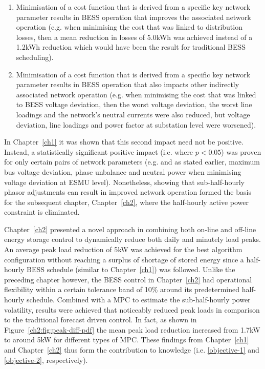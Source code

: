 \begin{enumerate}
	\item Minimisation of a cost function that is derived from a specific key network parameter results in BESS operation that improves the associated network operation (e.g. when minimising the cost that was linked to distribution losses, then a mean reduction in losses of 5.0kWh was achieved instead of a 1.2kWh reduction which would have been the result for traditional BESS scheduling).
	\item Minimisation of a cost function that is derived from a specific key network parameter results in BESS operation that also impacts other indirectly associated network operation (e.g. when minimising the cost that was linked to BESS voltage deviation, then the worst voltage deviation, the worst line loadings and the network's neutral currents were also reduced, but voltage deviation, line loadings and power factor at substation level were worsened).
\end{enumerate}

In Chapter~\ref{ch1} it was shown that this second impact need not be positive.
Instead, a statistically significant positive impact (i.e. where $p<0.05$) was proven for only certain pairs of network parameters (e.g. and as stated earlier, maximum bus voltage deviation, phase unbalance and neutral power when minimising voltage deviation at ESMU level).
Nonetheless, showing that sub-half-hourly phasor adjustments can result in improved network operation formed the basis for the subsequent chapter, Chapter~\ref{ch2}, where the half-hourly active power constraint is eliminated.

Chapter~\ref{ch2} presented a novel approach in combining both on-line and off-line energy storage control to dynamically reduce both daily and minutely load peaks.
An average peak load reduction of 5kW was achieved for the best algorithm configuration without reaching a surplus of shortage of stored energy since a half-hourly BESS schedule (similar to Chapter~\ref{ch1}) was followed.
Unlike the preceding chapter however, the BESS control in Chapter~\ref{ch2} had operational flexibility within a certain tolerance band of 10\% around its predetermined half-hourly schedule.
Combined with a MPC to estimate the sub-half-hourly power volatility, results were achieved that noticeably reduced peak loads in comparison to the traditional forecast driven control.
In fact, as shown in Figure~\ref{ch2:fig:peak-diff-pdf} the mean peak load reduction increased from 1.7kW to around 5kW for different types of MPC.
These findings from Chapter~\ref{ch1} and Chapter~\ref{ch2} thus form the contribution to knowledge (i.e. \ref{objective-1} and \ref{objective-2}, respectively).

